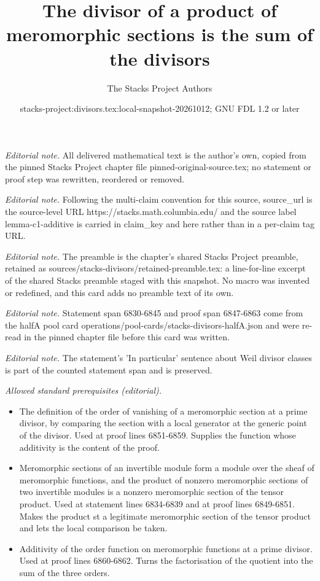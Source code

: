 \documentclass[10pt,a4paper]{amsart}
\title{The divisor of a product of meromorphic sections is the sum of the divisors}
\author{The Stacks Project Authors}
\date{stacks-project:divisors.tex:local-snapshot-20261012; GNU FDL 1.2 or later}
\theoremstyle{plain}
\theoremstyle{definition}
\theoremstyle{remark}
\numberwithin{equation}{subsection}
\begin{document}
\maketitle
\noindent\textit{Editorial note.} All delivered mathematical text is the author's own, copied from the pinned Stacks Project chapter file pinned-original-source.tex; no statement or proof step was rewritten, reordered or removed.\par\medskip
\noindent\textit{Editorial note.} Following the multi-claim convention for this source, source\_url is the source-level URL https://stacks.math.columbia.edu/ and the source label lemma-c1-additive is carried in claim\_key and here rather than in a per-claim tag URL.\par\medskip
\noindent\textit{Editorial note.} The preamble is the chapter's shared Stacks Project preamble, retained as sources/stacks-divisors/retained-preamble.tex: a line-for-line excerpt of the shared Stacks preamble staged with this snapshot. No macro was invented or redefined, and this card adds no preamble text of its own.\par\medskip
\noindent\textit{Editorial note.} Statement span 6830-6845 and proof span 6847-6863 come from the halfA pool card operations/pool-cards/stacks-divisors-halfA.json and were re-read in the pinned chapter file before this card was written.\par\medskip
\noindent\textit{Editorial note.} The statement's 'In particular' sentence about Weil divisor classes is part of the counted statement span and is preserved.\par\medskip
\noindent\textit{Allowed standard prerequisites (editorial).}\begin{itemize}
\item The definition of the order of vanishing of a meromorphic section at a prime divisor, by comparing the section with a local generator at the generic point of the divisor. Used at proof lines 6851-6859. Supplies the function whose additivity is the content of the proof.
\item Meromorphic sections of an invertible module form a module over the sheaf of meromorphic functions, and the product of nonzero meromorphic sections of two invertible modules is a nonzero meromorphic section of the tensor product. Used at statement lines 6834-6839 and at proof lines 6849-6851. Makes the product st a legitimate meromorphic section of the tensor product and lets the local comparison be taken.
\item Additivity of the order function on meromorphic functions at a prime divisor. Used at proof lines 6860-6862. Turns the factorisation of the quotient into the sum of the three orders.
\end{itemize}\medskip
\end{document}
